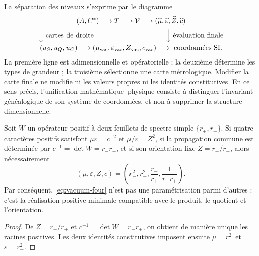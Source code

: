 La séparation des niveaux s'exprime par le diagramme
\[
\begin{array}{c}
(A,C^*)\longrightarrow T\longrightarrow\mathcal V
\longrightarrow
(\widehat\mu,\widehat\varepsilon,\widehat Z,\widehat c)
\\[2mm]
\Big\downarrow\text{ cartes de droite}\hspace{36mm}
\Big\downarrow\text{ évaluation finale}
\\[2mm]
(u_S,u_Q,u_C)\longrightarrow
(\mu_{\rm vac},\varepsilon_{\rm vac},Z_{\rm vac},c_{\rm vac})
\longrightarrow\text{ coordonnées SI}.
\end{array}
\]
La première ligne est adimensionnelle et opératorielle ; la deuxième détermine les types de
grandeur ; la troisième sélectionne une carte métrologique. Modifier la carte finale
ne modifie ni les valeurs propres ni les identités constitutives. En ce
sens précis, l'unification mathématique--physique consiste à distinguer
l'invariant généalogique de son système de coordonnées, et non à supprimer la
structure dimensionnelle.

\begin{proposition}
Soit \(W\) un opérateur positif à deux feuillets de spectre simple
\(\{r_+,r_-\}\). Si quatre caractères positifs satisfont
\(\mu\varepsilon=c^{-2}\) et \(\mu/\varepsilon=Z^2\), si la propagation
commune est déterminée par \(c^{-1}=\det W=r_-r_+\), et si son orientation
fixe \(Z=r_-/r_+\), alors nécessairement
\[
(\mu,\varepsilon,Z,c)
=\left(r_-^2,r_+^2,\frac{r_-}{r_+},\frac1{r_-r_+}\right).
\]
Par conséquent, \cref{eq:vacuum-four} n'est pas une paramétrisation parmi d'autres :
c'est la réalisation positive minimale compatible avec le produit, le quotient et
l'orientation.
\end{proposition}

\begin{proof}
De \(Z=r_-/r_+\) et \(c^{-1}=\det W=r_-r_+\), on obtient de manière unique les
racines positives. Les deux identités constitutives imposent ensuite
\(\mu=r_-^2\) et \(\varepsilon=r_+^2\).
\end{proof}

